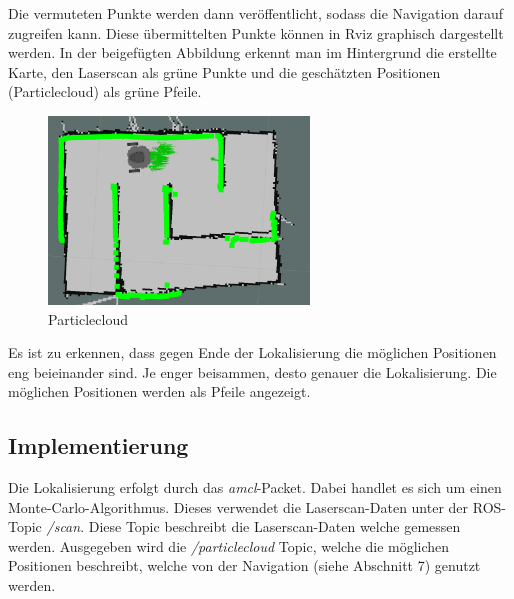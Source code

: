 {{		Die vermuteten Punkte werden dann veröffentlicht, sodass die Navigation darauf zugreifen kann. Diese übermittelten Punkte können in Rviz graphisch dargestellt werden. In der beigefügten Abbildung erkennt man im Hintergrund die erstellte Karte, den Laserscan als grüne Punkte und die geschätzten Positionen (Particlecloud) als grüne Pfeile.
		
	\begin{figure}[H]
		\centering
		\includegraphics[height=5cm]{Bilder/amcl_clear_pointcloud.png}
		\caption{Particlecloud} 
		\label{pic:amclclearpos}
	\end{figure}

	Es ist zu erkennen, dass gegen Ende der Lokalisierung  die möglichen Positionen eng beieinander sind. Je enger beisammen, desto genauer die Lokalisierung. Die möglichen Positionen werden als Pfeile angezeigt.
	}

	\subsection{Implementierung}
	{
		Die Lokalisierung erfolgt durch das \textit{amcl}-Packet. Dabei handlet es sich um einen Monte-Carlo-Algorithmus. Dieses verwendet die Laserscan-Daten unter der ROS-Topic \textit{/scan}. Diese Topic beschreibt die Laserscan-Daten welche gemessen werden. Ausgegeben wird die \textit{/particlecloud} Topic, welche die möglichen Positionen beschreibt, welche von der Navigation (siehe Abschnitt 7) genutzt werden.
	}
}